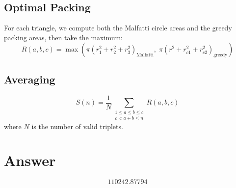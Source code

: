 \documentclass[12pt]{article}
\begin{document}
\subsection{Optimal Packing}
For each triangle, we compute both the Malfatti circle areas and the greedy packing areas, then take the maximum:
\[
R(a,b,c) = \max\left(\pi(r_1^2 + r_2^2 + r_3^2)_{\text{Malfatti}},\; \pi(r^2 + r_{c1}^2 + r_{c2}^2)_{\text{greedy}}\right)
\]

\subsection{Averaging}
\[
S(n) = \frac{1}{N} \sum_{\substack{1 \le a \le b \le c \\ c < a+b \le n}} R(a,b,c)
\]
where $N$ is the number of valid triplets.

\section{Answer}

\[
\boxed{110242.87794}
\]
\end{document}
